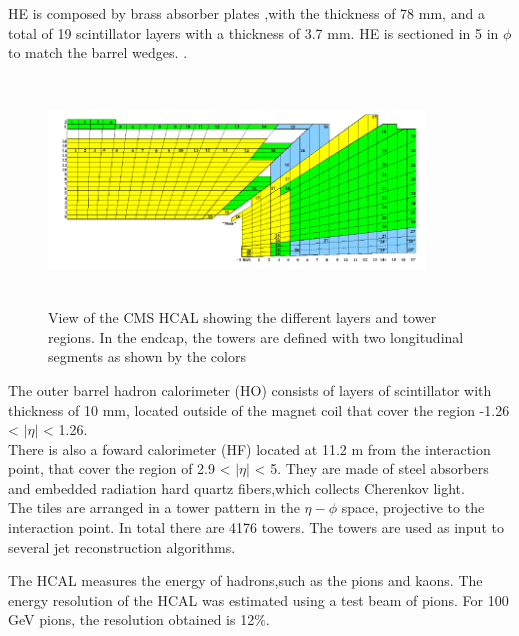 HE is composed by brass absorber plates ,with the thickness of 78 mm, and a total of  19 scintillator layers with a thickness of 3.7 mm.  HE is sectioned in 5 in $\phi$ to match the barrel wedges.
 . %
\\
\begin{figure}[!htbp]
	\centering
	\includegraphics[width=10cm,height=6cm]{Chapter2/hcal.png}
	\caption{View of the CMS HCAL showing the different layers and tower regions. In the endcap, the towers are defined with two longitudinal segments as shown by the colors\cite{cms-manual}}\label{hcal}
\end{figure}
The outer barrel hadron calorimeter (HO) consists of layers of scintillator with  thickness of 10 mm, located outside of the
magnet coil that cover the region -1.26 < $|\eta|$ < 1.26.\\
There is also a foward calorimeter (HF) located at 11.2 m from the interaction point, that cover the region of 2.9 < $|\eta|$ < 5. They are made of
steel absorbers and embedded radiation hard quartz fibers,which collects 
Cherenkov light\cite{cms-manual}.%
\\
  
The tiles are arranged in a tower pattern in the  $\eta-\phi$ space, projective to the interaction point.  In total there
are 4176 towers. The towers are used as input to several jet reconstruction algorithms.

The HCAL measures the energy of hadrons,such as the pions and kaons. 
The energy resolution of the HCAL was estimated using a test beam of pions. For 100 GeV pions, the resolution obtained is 12$\%$.

